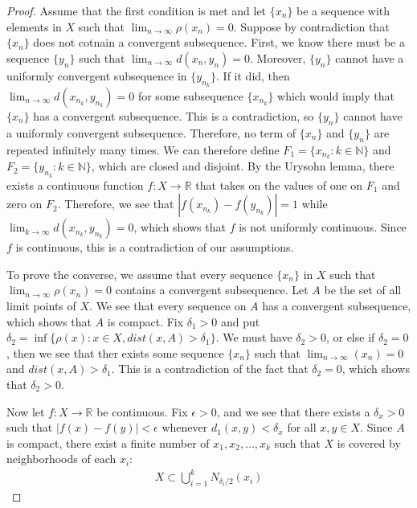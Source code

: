 \documentclass[psamsfonts]{amsart}
\theoremstyle{definition}
\theoremstyle{remark}
\numberwithin{equation}{section}
\begin{document}
\begin{proof}
Assume that the first condition is met and let $\{ x_n \}$ be a sequence with elements in $X$ such that $\lim_{n \to \infty} \rho(x_n ) = 0$. Suppose by contradiction that $\{ x_n \}$ does not cotnain a convergent subsequence. First, we know there must be a sequence $\{ y_n \}$ such that $\lim_{n \to \infty} d(x_n, y_n) = 0$. Moreover, $\{y_n \}$ cannot have a uniformly convergent subsequence in $\{ y_{n_k} \}$. If it did, then $\lim_{n \to \infty} d(x_{n_k}, y_{n_k} ) = 0$ for some subsequence $\{x_{n_k} \}$ which would imply that $\{x_n\}$ has a convergent subsequence. This is a contradiction, so $\{ y_n \}$ cannot have a uniformly convergent subsequence. Therefore, no term of $\{x_n \}$ and $\{ y_n \}$ are repeated infinitely many times. We can therefore define $F_1 = \{ x_{n_k} : k \in \mathbb{N} \}$ and $F_2 = \{ y_{n_k} : k \in \mathbb{N} \}$, which are closed and disjoint. By the Urysohn lemma, there exists a continuous function $f: X \to \mathbb{R}$ that takes on the values of one on $F_1$ and zero on $F_2$. Therefore, we see that $|f(x_{n_k}) - f(y_{n_k})| = 1$ while $\lim_{k \to \infty} d(x_{n_k},y_{n_k}) = 0$, which shows that $f$ is not uniformly continuous. Since $f$ is continuous, this is a contradiction of our assumptions.

To prove the converse, we assume that every sequence $\{x_n \}$ in $X$ such that $\lim_{n \to \infty} \rho(x_n) =0$ contains a convergent subsequence. Let $A$ be the set of all limit points of $X$. We see that every sequence on $A$ has a convergent subsequence, which shows that $A$ is compact. Fix $\delta_1 > 0$ and put $\delta_2 = \inf \{ \rho(x): x \in X, dist(x,A) > \delta_1 \}$. We must have $\delta_2 > 0$, or else if $\delta_ 2 = 0$, then we see that ther exists some sequence $\{ x_n \}$ such that $\lim_{n \to \infty} (x_n) = 0$ and $dist(x,A) > \delta_1$. This is a contradiction of the fact that $\delta_2 = 0$, which shows that $\delta_2 > 0$.

Now let $f: X \to \mathbb{R}$ be continuous. Fix $\epsilon > 0$, and we see that there exists a $\delta_x > 0$ such that $|f(x) - f(y)| < \epsilon$ whenever $d_1(x,y) < \delta_x$ for all $x,y \in X$. Since $A$ is compact, there exist a finite number of $x_1, x_2, \ldots, x_k$ such that $X$ is covered by neighborhoods of each $x_i$:
\begin{eqnarray}
X \subset \bigcup_{i=1}^k N_{\delta_i/2} (x_i)
\end{eqnarray}


\end{proof}
\end{document}
